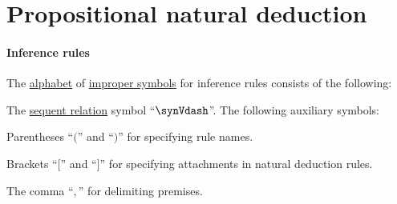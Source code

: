 \section{Propositional natural deduction}\label{sec:propositional_natural_deduction}

\paragraph{Inference rules}

\begin{definition}\label{def:inference_rule_alphabet}\mimprovised
  The \hyperref[def:formal_language/alphabet]{alphabet} of \hyperref[con:improper_symbol]{improper symbols} for inference rules consists of the following:

  \begin{thmenum}
     The \hyperref[def:sequent]{sequent relation} symbol \enquote{\( \synVdash \)}.
     The following auxiliary symbols:
    \begin{thmenum}
       Parentheses \enquote{\( ( \)} and \enquote{\( ) \)} for specifying rule names.

       Brackets \enquote{\( [ \)} and \enquote{\( ] \)} for specifying attachments in natural deduction rules.

       The comma \enquote{\( , \)} for delimiting premises.
    \end{thmenum}
  \end{thmenum}
\end{definition}

